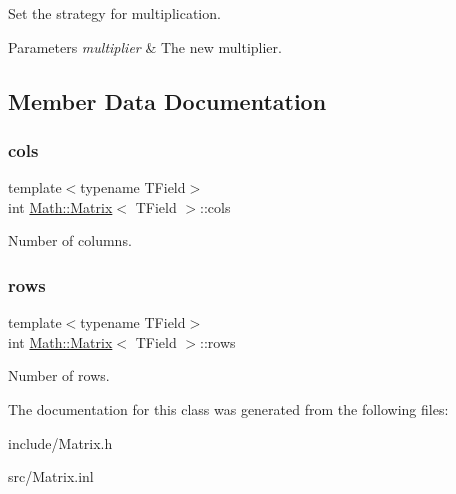 Set the strategy for multiplication. 


\begin{DoxyParams}{Parameters}
{\em multiplier} & The new multiplier. \\
\hline
\end{DoxyParams}


\subsection{Member Data Documentation}
\mbox{\label{classMath_1_1Matrix_ad9f2871b3b80b076d000f5f95c8ca8c5}} 
\subsubsection{\texorpdfstring{cols}{cols}}
{\footnotesize\ttfamily template$<$typename T\+Field$>$ \\
int \mbox{\hyperlink{classMath_1_1Matrix}{Math\+::\+Matrix}}$<$ T\+Field $>$\+::cols}

Number of columns. \mbox{\label{classMath_1_1Matrix_a5c1383f7befaac0c43660f75614c8bd5}} 
\subsubsection{\texorpdfstring{rows}{rows}}
{\footnotesize\ttfamily template$<$typename T\+Field$>$ \\
int \mbox{\hyperlink{classMath_1_1Matrix}{Math\+::\+Matrix}}$<$ T\+Field $>$\+::rows}

Number of rows. 

The documentation for this class was generated from the following files\+:\begin{DoxyCompactItemize}
\item 
include/Matrix.\+h\item 
src/Matrix.\+inl\end{DoxyCompactItemize}
